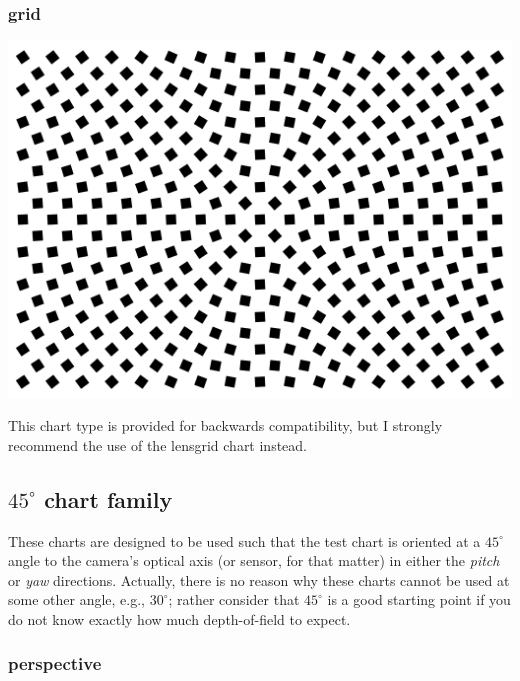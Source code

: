 \documentclass[a4paper]{article}
\begin{document}
\subsubsection{grid}

\parbox{\textwidth}{
\centering
\includegraphics[width=\textwidth]{figures/chart_grid}
}
\vspace{1ex}

This chart type is provided for backwards compatibility, but I strongly
recommend the use of the \textsf{lensgrid} chart instead.

\subsection{$45^\circ$ chart family}
These charts are designed to be used such that the test chart is oriented at
a $45^\circ$ angle to the camera's optical axis (or sensor, for that matter)
in either the \emph{pitch} or \emph{yaw} directions. Actually, there is no
reason why these charts cannot be used at some other angle, e.g.,
$30^\circ$; rather consider that $45^\circ$ is a good starting point if you
do not know exactly how much depth-of-field to expect.

\subsubsection{perspective}
\label{sec:perspective_chart}
\end{document}
